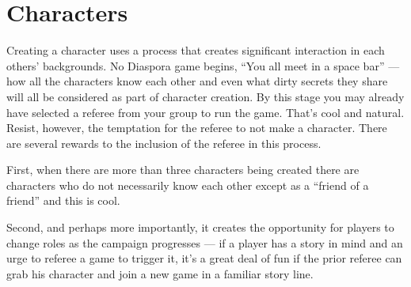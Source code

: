\chapter{Characters}\label{sec:characters} %

Creating a character uses a process that creates significant interaction in each others' backgrounds. No Diaspora game begins, ``You all meet in a space bar'' --- how all the characters know each other and even what dirty secrets they share will all be considered as part of character creation. By this stage you may already have selected a referee from your group to run the game. That's cool and natural. Resist, however, the temptation for the referee to not make a character. There are several rewards to the inclusion of the referee in this process.

First, when there are more than three characters being created there are characters who do not necessarily know each other except as a ``friend of a friend'' and this is cool.

Second, and perhaps more importantly, it creates the opportunity for players to change roles as the campaign progresses --- if a player has a story in mind and an urge to referee a game to trigger it, it's a great deal of fun if the prior referee can grab his character and join a new game in a familiar story line.







